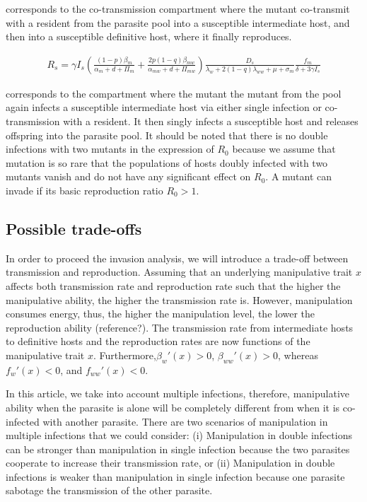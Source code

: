 \documentclass{article}
\begin{document}
corresponds to the co-transmission compartment where the mutant co-transmit with a resident from the parasite pool into a susceptible intermediate host, and then into a susceptible definitive host, where it finally reproduces.

\begin{align*}
R_s = \gamma  I_s \left(\frac{(1-p) \beta_m}{\alpha_m + d + \Pi_m} + \frac{2 p (1-q) \beta_{mw}}{\alpha_{mw} + d + \Pi_{mw}}\right) \frac{D_s}{\lambda_w  + 2 (1-q) \lambda_{ww} + \mu + \sigma_m}\frac{f_m}{\delta +3 \gamma  I_s}
\end{align*}

corresponds to the compartment where the mutant the mutant from the pool again infects a susceptible intermediate host via either single infection or co-transmission with a resident. It then singly infects a susceptible host and releases offspring into the parasite pool. It should be noted that there is no double infections with two mutants in the expression of $R_0$ because we assume that mutation is so rare that the populations of hosts doubly infected with two mutants vanish and do not have any significant effect on $R_0$. A mutant can invade if its basic reproduction ratio $R_0 > 1$. 

\subsection{Possible trade-offs}
In order to proceed the invasion analysis, we will introduce a trade-off between transmission and reproduction. Assuming that an underlying manipulative trait $x$ affects both transmission rate and reproduction rate such that the higher the manipulative ability, the higher the transmission rate is. However, manipulation consumes energy, thus, the higher the manipulation level, the lower the reproduction ability (reference?). The transmission rate from intermediate hosts to definitive hosts and the reproduction rates are now functions of the manipulative trait $x$. Furthermore,$\beta_w'(x) > 0$, $\beta_{ww}'(x) > 0$, whereas $f_w'(x) < 0$, and $f_{ww}'(x) < 0$.

In this article, we take into account multiple infections, therefore, manipulative ability when the parasite is alone will be completely different from when it is co-infected with another parasite. There are two scenarios of manipulation in multiple infections that we could consider: (i) Manipulation in double infections can be stronger than manipulation in single infection because the two parasites cooperate to increase their transmission rate, or (ii) Manipulation in double infections is weaker than manipulation in single infection because one parasite sabotage the transmission of the other parasite. 
\end{document}
